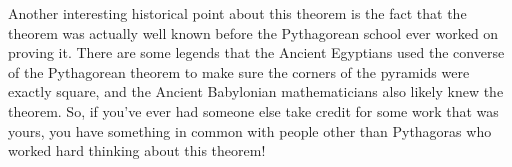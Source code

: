 \documentclass{ximera}
\begin{document}
Another interesting historical point about this theorem is the fact that the theorem was actually well known before the Pythagorean school ever worked on proving it. There are some legends that the Ancient Egyptians used the converse of the Pythagorean theorem to make sure the corners of the pyramids were exactly square, and the Ancient Babylonian mathematicians also likely knew the theorem. So, if you've ever had someone else take credit for some work that was yours, you have something in common with people other than Pythagoras who worked hard thinking about this theorem!
\end{document}
